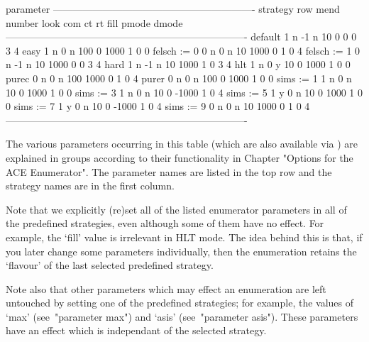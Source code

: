     \begintt
                                         parameter
                -------------------------------------------------------------
    strategy    row  mend  number  look  com    ct     rt  fill  pmode  dmode
    -------------------------------------------------------------------------
    default       1     n      -1     n   10     0      0     0      3      4
    easy          1     n       0     n  100     0   1000     1      0      0
    felsch := 0   0     n       0     n   10  1000      0     1      0      4
    felsch := 1   0     n      -1     n   10  1000      0     0      3      4
    hard          1     n      -1     n   10  1000      1     0      3      4
    hlt           1     n       0     y   10     0   1000     1      0      0
    purec         0     n       0     n  100  1000      0     1      0      4
    purer         0     n       0     n  100     0   1000     1      0      0
    sims := 1     1     n       0     n   10     0   1000     1      0      0
    sims := 3     1     n       0     n   10     0  -1000     1      0      4
    sims := 5     1     y       0     n   10     0   1000     1      0      0
    sims := 7     1     y       0     n   10     0  -1000     1      0      4
    sims := 9     0     n       0     n   10  1000      0     1      0      4
    -------------------------------------------------------------------------
    \endtt

    The  various  parameters  occurring  in  this table  (which  are  also
    available  via {\GAP})  are  explained in  groups  according to  their
    functionality  in  Chapter  "Options  for the  ACE  Enumerator".   The
    parameter names are  listed in the top row and  the strategy names are
    in the first column.

    Note  that  we  explicitly   (re)set  all  of  the  listed  enumerator
    parameters in all of the  predefined strategies, even although some of
    them have  no effect. For example,  the `fill' value  is irrelevant in
    HLT mode.   The idea  behind this  is that, if  you later  change some
    parameters individually, then the enumeration retains the `flavour' of
    the  last   selected  predefined  strategy.   

    Note also  that other parameters  which may effect an  enumeration are
    left  untouched  by setting  one  of  the  predefined strategies;  for
    example,  the values  of  `max' (see~"parameter  max") and  `asis'
    (see~"parameter asis").
    These parameters have  an effect which is independant  of the selected
    strategy.

